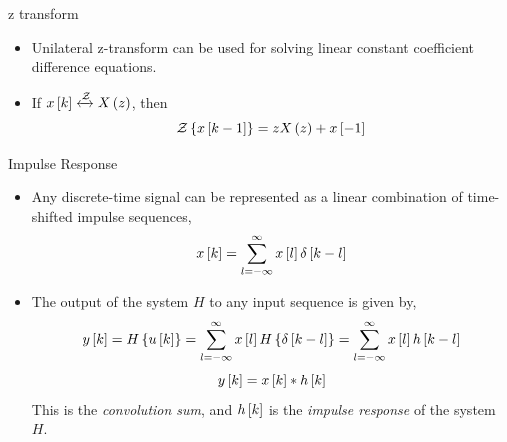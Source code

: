 \documentclass[aspectratio=169]{beamer}
\def\lp{\ensuremath\left(}
\def\rp{\ensuremath\right)}
\def\lc{\ensuremath\left\{}
\def\rc{\ensuremath\right\}}
\def\ls{\ensuremath\left[}
\def\rs{\ensuremath\right]}
\begin{document}
\begin{frame}[t]{z transform}
\begin{itemize}
    \item Unilateral z-transform can be used for solving linear constant coefficient difference equations.
    \item If $x\ls k\rs \xleftrightarrow{\mathcal{Z}} X\lp z\rp$, then
    \[ \mathcal{Z}\lc x\ls k - 1\rs\rc = zX\lp z\rp + x\ls -1\rs \]
\end{itemize}
\end{frame}


\begin{frame}{Impulse Response}
\begin{center}
\end{center}

\begin{itemize}
    \item Any discrete-time signal can be represented as a linear combination of time-shifted impulse sequences,
    \[ x\ls k\rs = \sum_{l=-\infty}^{\infty} x\ls l\rs \delta \ls k - l\rs \]

    \item The output of the system $H$ to any input sequence is given by,
    \[ y\ls k\rs = H\lc u\ls k\rs\rc = \sum_{l=-\infty}^{\infty} x\ls l\rs H\lc \delta \ls k - l\rs\rc = \sum_{l=-\infty}^{\infty} x\ls l\rs h\ls k - l\rs \]
    \[ y\ls k\rs = x\ls k\rs * h\ls k \rs \]
    This is the \textit{convolution sum}, and $h\ls k\rs$ is the \textit{impulse response} of the system $H$.
\end{itemize}
\end{frame}
\end{document}
